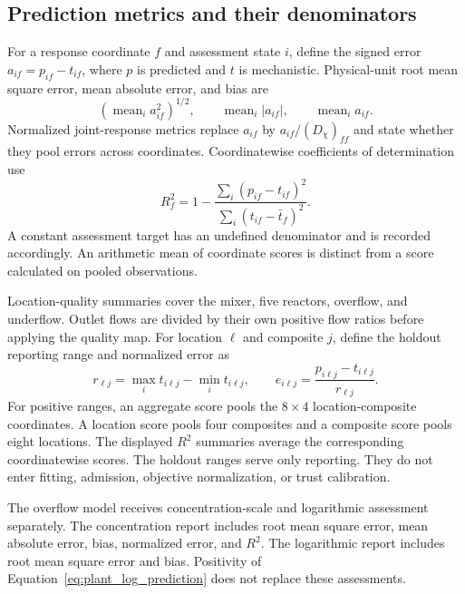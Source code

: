 \subsection{Prediction metrics and their denominators}

For a response coordinate $f$ and assessment state $i$, define the signed error $a_{if}=p_{if}-t_{if}$, where $p$ is predicted and $t$ is mechanistic. Physical-unit root mean square error, mean absolute error, and bias are
\begin{equation}
\left(\operatorname{mean}_i a_{if}^2\right)^{1/2},\qquad
\operatorname{mean}_i|a_{if}|,\qquad
\operatorname{mean}_i a_{if}.
\end{equation}
Normalized joint-response metrics replace $a_{if}$ by $a_{if}/(D_\chi)_{ff}$ and state whether they pool errors across coordinates. Coordinatewise coefficients of determination use
\begin{equation}
R_f^2=1-\frac{\sum_i(p_{if}-t_{if})^2}{\sum_i(t_{if}-\bar t_f)^2}.
\end{equation}
A constant assessment target has an undefined denominator and is recorded accordingly. An arithmetic mean of coordinate scores is distinct from a score calculated on pooled observations.

Location-quality summaries cover the mixer, five reactors, overflow, and underflow. Outlet flows are divided by their own positive flow ratios before applying the quality map. For location $\ell$ and composite $j$, define the holdout reporting range and normalized error as
\begin{equation}
r_{\ell j}=\max_it_{i\ell j}-\min_it_{i\ell j},\qquad
e_{i\ell j}=\frac{p_{i\ell j}-t_{i\ell j}}{r_{\ell j}}.
\end{equation}
For positive ranges, an aggregate score pools the $8\times4$ location-composite coordinates. A location score pools four composites and a composite score pools eight locations. The displayed $R^2$ summaries average the corresponding coordinatewise scores. The holdout ranges serve only reporting. They do not enter fitting, admission, objective normalization, or trust calibration.

The overflow model receives concentration-scale and logarithmic assessment separately. The concentration report includes root mean square error, mean absolute error, bias, normalized error, and $R^2$. The logarithmic report includes root mean square error and bias. Positivity of Equation~\eqref{eq:plant_log_prediction} does not replace these assessments.


